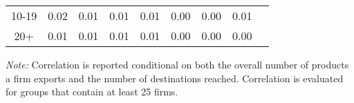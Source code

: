 \documentclass{article}
\begin{document}
\begin{table}[h]
{\begin{threeparttable}
\begin{tabular}{cllllllll}
10-19                                      & 0.02     & 0.01    & 0.01 & 0.01 & 0.00 & 0.00  & 0.01 \\
20+                                            & 0.01     & 0.01    & 0.01 & 0.01 & 0.00 & 0.00  & 0.00 \\
\hline\hline
\end{tabular}
\begin{tablenotes}
\small
\item  \noindent  \footnotesize{\emph{Note:} Correlation is reported conditional on both the overall number of products a firm exports and the number of destinations reached. Correlation is evaluated for groups that contain at least 25 firms. }
\end{tablenotes}
\end{threeparttable}
}
\end{table}
\end{document}
